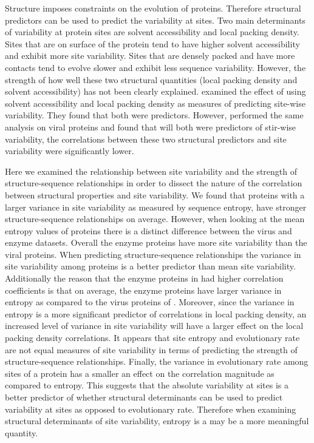 \documentclass[12pt]{article}
\begin{document}
\indent Structure imposes constraints on the evolution of proteins. Therefore structural predictors can be used to predict the variability at sites. Two main determinants of variability at protein sites are solvent accessibility and local packing density. Sites that are on surface of the protein tend to have higher solvent accessibility and exhibit more site variability. Sites that are densely packed and have more contacts tend to evolve slower and exhibit less sequence variability. However, the strength of how well these two structural quantities (local packing density and solvent accessibility) has not been clearly explained. \cite{Yehetal2014a} examined the effect of using solvent accessibility and local packing density as measures of predicting site-wise variability. They found that both were predictors. However, \cite{Shahmoradietal2014} performed the same analysis on viral proteins and found that will both were predictors of stir-wise variability, the correlations between these two structural predictors and site variability were significantly lower. 

\indent Here we examined the relationship between site variability and the strength of structure-sequence relationships in order to dissect the nature of the correlation between structural properties and site variability. We found that proteins with a larger variance in site variability as measured by sequence entropy, have stronger structure-sequence relationships on average. However, when looking at the mean entropy values of proteins there is a distinct difference between the virus and enzyme datasets. Overall the enzyme proteins have more site variability than the viral proteins. When predicting structure-sequence relationships the variance in site variability among proteins is a better predictor than mean site variability.  \indent Additionally the reason that the enzyme proteins in \cite{Yehetal2014a} had higher correlation coefficients is that on average, the enzyme proteins have larger variance in entropy as compared to the virus proteins of \cite{Shahmoradietal2014}. Moreover, since the variance in entropy is a more significant predictor of correlations in local packing density, an increased level of variance in site variability will have a larger effect on the local packing density correlations. It appears that site entropy and evolutionary rate are not equal measures of site variability in terms of predicting the strength of structure-sequence relationships. Finally, the variance in evolutionary rate among sites of a protein has a smaller an effect on the correlation magnitude as compared to entropy. This suggests that the absolute variability at sites is a better predictor of whether structural determinants can be used to predict variability at sites  as opposed to evolutionary rate. Therefore when examining structural determinants of site variability, entropy is a may be a more meaningful quantity. 
\end{document}
